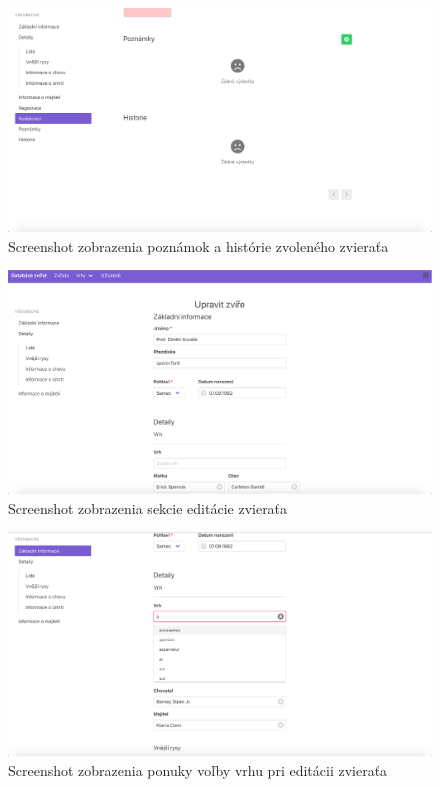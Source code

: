 \begin{figure}[H]
	\includegraphics[width=1.0\textwidth]{media/priloha/zviera/4.png}
	\caption{Screenshot zobrazenia poznámok a histórie zvoleného zvieraťa}
\end{figure}

\begin{figure}[H]
	\includegraphics[width=1.0\textwidth]{media/priloha/zviera/editacia/1.png}
	\caption{Screenshot zobrazenia sekcie editácie zvieraťa}
\end{figure}

\begin{figure}[H]
	\includegraphics[width=1.0\textwidth]{media/priloha/zviera/editacia/2.png}
	\caption{Screenshot zobrazenia ponuky voľby vrhu pri editácii zvieraťa}
\end{figure}

